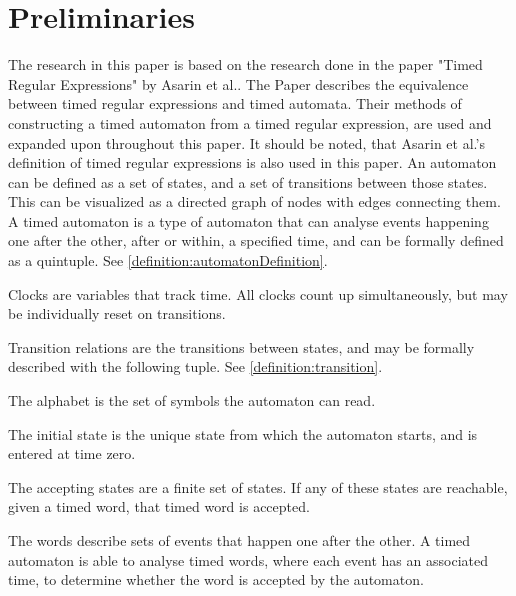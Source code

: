 \section{Preliminaries}\label{sec:preliminaries}






The research in this paper is based on the research done in the paper "Timed Regular Expressions" by Asarin et al.\cite{Eugene2001}. The Paper describes the equivalence between timed regular expressions and timed automata. Their methods of constructing a timed automaton from a timed regular expression, are used and expanded upon throughout this paper. It should be noted, that Asarin et al.'s definition of timed regular expressions is also used in this paper.
An automaton can be defined as a set of states, and a set of transitions between those states. This can be visualized as a directed graph of nodes with edges connecting them.
A timed automaton is a type of automaton that can analyse events happening one after the other, after or within, a specified time, and can be formally defined as a quintuple\cite{ALUR1994}. See \cref{definition:automatonDefinition}.


Clocks are variables that track time. All clocks count up simultaneously, but may be individually reset on transitions.

Transition relations are the transitions between states, and may be formally described with the following tuple. See \cref{definition:transition}.


The alphabet is the set of symbols the automaton can read.

The initial state is the unique state from which the automaton starts, and is entered at time zero.

The accepting states are a finite set of states. If any of these states are reachable, given a timed word, that timed word is accepted.

The words describe sets of events that happen one after the other. A timed automaton is able to analyse timed words, where each event has an associated time, to determine whether the word is accepted by the automaton.
